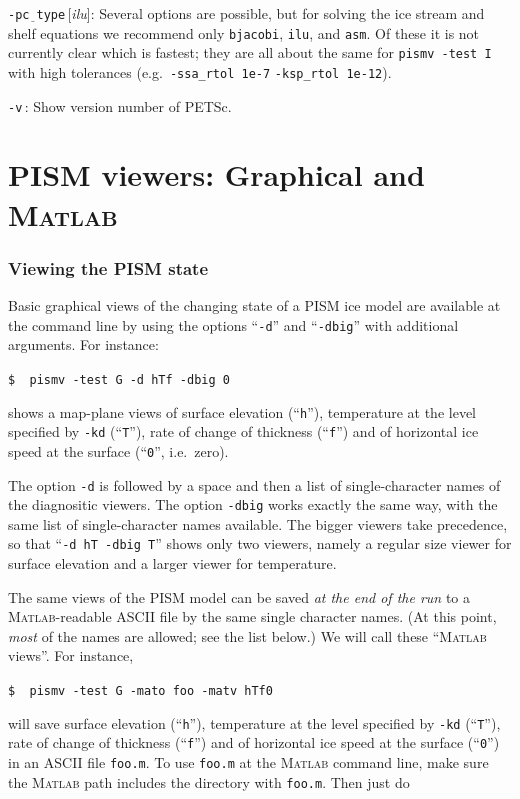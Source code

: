 \documentclass[11pt,final]{amsart}
\renewcommand{\t}[1]{\texttt{#1}}
\newcommand{\Matlab}{\textsc{Matlab}\xspace}
\newcommand{\rawopt}[1]{\vspace{1mm}\noindent \large\texttt{-#1}\normalsize}
\newcommand{\opt}[1]{\rawopt{#1}\,:\quad}
\newcommand{\optdef}[2]{\rawopt{#1}\,[\textsl{#2}]:\quad}
\newcommand{\und}{$\underline{\,\,\,}$}
\begin{document}
\optdef{pc\und type}{ilu}   Several options are possible, but for solving the ice stream and shelf equations we recommend only \t{bjacobi}, \t{ilu}, and \t{asm}.  Of these it is not currently clear which is fastest; they are all about the same for \verb|pismv -test I| with high tolerances (e.g.~\verb|-ssa_rtol 1e-7| \verb|-ksp_rtol 1e-12|).

\opt{v}   Show version number of PETSc.


\clearpage \newpage
\section{PISM viewers: Graphical and \Matlab}\label{sect:viewers}

\subsubsection*{Viewing the PISM state}  Basic graphical views of the changing state of a PISM ice model are available at the command line by using the options ``\t{-d}'' and ``\t{-dbig}'' with additional arguments.  For instance:

\verb|$  pismv -test G -d hTf -dbig 0|

\noindent shows a map-plane views of surface elevation (``\t{h}''), temperature at the level specified by \t{-kd} (``\t{T}''), rate of change of thickness (``\t{f}'') and of horizontal ice speed at the surface (``\t{0}'', i.e.~zero).

The option \t{-d} is followed by a space and then a list of single-character names of the diagnositic viewers.  The option \t{-dbig} works exactly the same way, with the same list of single-character names available.  The bigger viewers take precedence, so that ``\t{-d hT -dbig T}'' shows only two viewers, namely a regular size viewer for surface elevation and a larger viewer for temperature.
\medskip

The same views of the PISM model can be saved \emph{at the end of the run} to a \Matlab-readable ASCII file by the same single character names.  (At this point, \emph{most} of the names are allowed; see the list below.)  We will call these ``\Matlab views''.  For instance,

\verb|$  pismv -test G -mato foo -matv hTf0|

\noindent will save surface elevation (``\t{h}''), temperature at the level specified by \t{-kd} (``\t{T}''), rate of change of thickness (``\t{f}'') and of horizontal ice speed at the surface (``\t{0}'') in an ASCII file \verb|foo.m|.  To use \verb|foo.m| at the \Matlab command line, make sure the \Matlab path includes the directory with \verb|foo.m|.  Then just do
\end{document}
